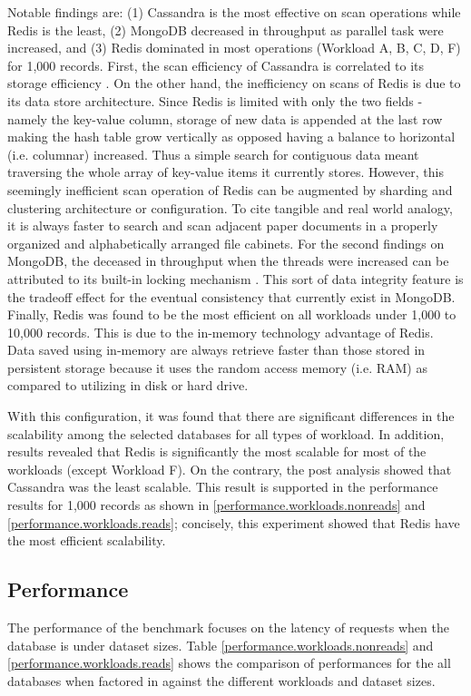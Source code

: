\documentclass[5p]{elsarticle}
\begin{document}
Notable findings are: (1) Cassandra is the most effective on scan operations while Redis is the least, (2) MongoDB decreased in throughput as parallel task were increased, and (3) Redis dominated in most operations (Workload A, B, C, D, F) for 1,000 records. 
First, the scan efficiency of Cassandra is correlated to its storage efficiency \cite{E.Chan2016}. 
On the other hand, the inefficiency on scans of Redis is due to its data store architecture. 
Since Redis is limited with only the two fields - namely the key-value column, storage of new data is appended at the last row making the hash table grow vertically as opposed having a balance to horizontal (i.e. columnar) increased. 
Thus a simple search for contiguous data meant traversing the whole array of key-value items it currently stores. 
However, this seemingly inefficient scan operation of Redis can be augmented by sharding and clustering architecture or configuration.
To cite tangible and real world analogy, it is always faster to search and scan adjacent paper documents in a properly organized and alphabetically arranged file cabinets. 
For the second findings on MongoDB, the deceased in throughput when the threads were increased can be attributed to its built-in locking mechanism \cite{A.Kabakus2017520}. 
This sort of data integrity feature is the tradeoff effect for the eventual consistency that currently exist in MongoDB. 
Finally, Redis was found to be the most efficient on all workloads under 1,000 to 10,000 records. 
This is due to the in-memory technology advantage of Redis. Data saved using in-memory are always retrieve faster than those stored in persistent storage because it uses the random access memory (i.e. RAM) as compared to utilizing in disk or hard drive. 

With this configuration, it was found that there are significant differences in the scalability among the selected databases for all types of workload.
In addition, results revealed that Redis is significantly the most scalable for most of the workloads (except Workload F). 
On the contrary, the post analysis showed that Cassandra was the least scalable. 
This result is supported in the performance results for 1,000 records as shown in \ref{performance.workloads.nonreads} and \ref{performance.workloads.reads}; 
concisely, this experiment showed that Redis have the most efficient scalability. 


\subsection{Performance}
The performance of the benchmark focuses on the latency of requests when the database is under dataset sizes.
Table \ref{performance.workloads.nonreads} and \ref{performance.workloads.reads} shows the comparison of performances for the all databases when factored in against the different workloads and dataset sizes. 
\end{document}

